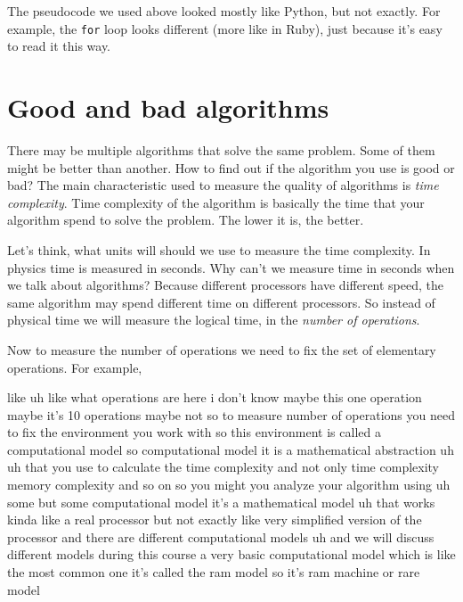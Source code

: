 The pseudocode we used above looked mostly like Python, but not exactly. For example, the \texttt{for} loop looks different (more like in Ruby), just because it's easy to read it this way.

\section{Good and bad algorithms}

There may be multiple algorithms that solve the same problem. Some of them might be better than another. How to find out if the algorithm you use is good or bad? The main characteristic used to measure the quality of algorithms is \emph{time complexity}. Time complexity of the algorithm is basically the time that your algorithm spend to solve the problem. The lower it is, the better. 

Let's think, what units will should we use to measure the time complexity. In physics time is measured in seconds. Why can't we measure time in seconds when we talk about algorithms? Because different processors have different speed, the same algorithm may spend different time on different processors. So instead of physical time we will measure the logical time, in the \emph{number of operations}.

Now to measure the number of operations we need to fix the set of elementary operations. For example, 

 like uh like what operations are here i don't know maybe this one operation maybe it's 10 operations maybe not so to measure number of operations you need to fix the environment you work with so this environment is called a computational model so computational model it is a mathematical abstraction uh uh that you use to calculate the time complexity and not only time complexity memory complexity and so on so you might you analyze your algorithm using uh some but some computational model it's a mathematical model uh that works kinda like a real processor but not exactly like very simplified version of the processor and there are different computational models uh and we will discuss different models during this course a very basic computational model which is like the most common one it's called the ram model so it's ram machine or rare model

